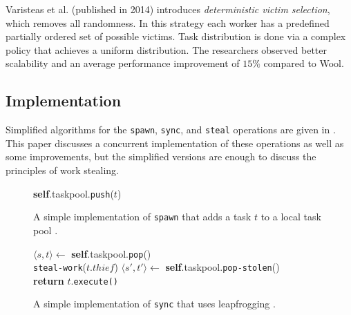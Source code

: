 Varisteas et al. \cite{varisteas2014dvs} (published in 2014) introduces \emph{deterministic victim selection}, which removes all randomness. In this strategy each worker has a predefined partially ordered set of possible victims. Task distribution is done via a complex policy that achieves a uniform distribution. The researchers observed better scalability and an average performance improvement of $15\%$ compared to Wool.

\subsection{Implementation}
Simplified algorithms for the \texttt{spawn}, \texttt{sync}, and \texttt{steal} operations are given in \cite{lace}. This paper discusses a concurrent implementation of these operations as well as some improvements, but the simplified versions are enough to discuss the principles of work stealing.

\begin{figure}
	\centering
	\begin{algorithm}[H]
		\SetStartEndCondition{ }{}{}%
		\AlgoDontDisplayBlockMarkers\SetAlgoNoEnd\SetAlgoNoLine%

		 {
			\textbf{self}.taskpool.\texttt{push}($t$)
		}
	\end{algorithm}

	\caption{A simple implementation of \texttt{spawn} that adds a task $t$ to a local task pool \cite{lace}.}
	\label{fig:workstealing_spawn}
\end{figure}

\begin{figure}
	\centering
	\begin{algorithm}[H]
		\SetStartEndCondition{ }{}{}%
		\AlgoDontDisplayBlockMarkers\SetAlgoNoEnd\SetAlgoNoLine%

		\Fn{\fun{}} {
			$\langle s, t \rangle \gets$ \textbf{self}.taskpool.\texttt{pop}() \\
			 {
				 {
					\texttt{steal-work}($t.thief$)
				}
				$\langle s', t' \rangle \gets $ \textbf{self}.taskpool.\texttt{pop-stolen}() \\
			}
			\textbf{return} $t.$\texttt{execute()}
		}
	\end{algorithm}

	\caption{A simple implementation of \texttt{sync} that uses leapfrogging \cite{lace}.}
	\label{fig:workstealing_sync}
\end{figure}

